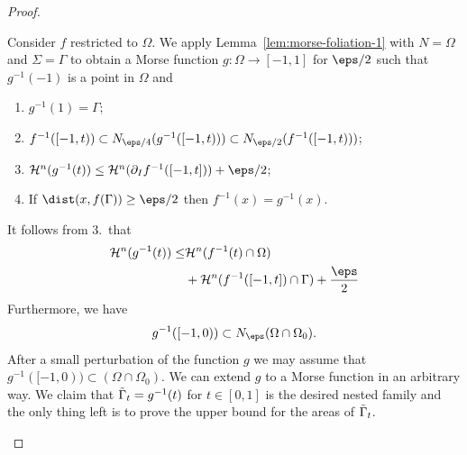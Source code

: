 \begin{lemma}
\begin{proof}
\begin{itemize}
            Consider $f$ restricted to $\Omega$. We apply Lemma~\ref{lem:morse-foliation-1} with $N = \Omega$ and $\Sigma = \Gamma$ to obtain a Morse function $g: \Omega \to [-1, 1]$ for $\eps/2$ such that $g^{-1}(-1)$ is a point in $\Omega$ and
            \begin{enumerate}
                \item $g^{-1}(1) = \Gamma$;
                \item $f^{-1}([-1, t)) \subset N_{\eps/4}(g^{-1}([-1, t))) \subset N_{\eps/2}(f^{-1}([-1, t)))$;
                \item $\mathcal{H}^n(g^{-1}(t)) \leq \mathcal{H}^n(\partial_I f^{-1}([-1, t])) + \eps/2$;
                \item If $\dist(x, f(\Gamma)) \geq \eps/2$ then $f^{-1}(x) = g^{-1}(x)$.
            \end{enumerate}
            It follows from 3.\ that
            \begin{equation*}
                \begin{split}
                    \mathcal{H}^n(g^{-1}(t)) \leq& \mathcal{H}^n(f^{-1}(t)\cap \Omega)\\
                    &+ \mathcal{H}^n(f^{-1}([-1, t])\cap \Gamma) + \frac{\eps}{2}
                \end{split}
            \end{equation*}
            Furthermore, we have
            \begin{equation*}
                g^{-1}([-1, 0)) \subset N_\eps(\Omega\cap \Omega_0).
            \end{equation*}
            After a small perturbation of the function $g$ we may assume that $g^{-1}([-1, 0)) \subset (\Omega\cap\Omega_0)$. We can extend $g$ to a Morse function in an arbitrary way. We claim that $\Tilde{\Gamma}_t = g^{-1}(t)$ for $t \in [0, 1]$ is the desired nested family and the only thing left is to prove the upper bound for the areas of $\Tilde{\Gamma}_t$.


\end{itemize}
\end{proof}
\end{lemma}
